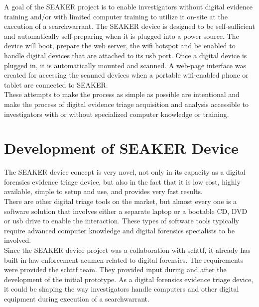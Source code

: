 \documentclass[12pt]{article}
\begin{document}
A goal of the SEAKER project is to enable investigators without 
digital evidence training and/or with limited computer training to utilize it
on-site at the execution of a \gls{searchwarrant}.  The SEAKER device is designed to
be self-sufficient and automatically self-preparing when it is plugged into a 
power source.  The device will boot, prepare the web server, the \gls{wifi} hotspot
and be enabled to handle digital devices that are attached to its \gls{usb} port.
Once a digital device is plugged in, it is automatically mounted and scanned.
A web-page interface was created for accessing the scanned devices when a portable
\gls{wifi}-enabled phone or tablet are connected to SEAKER.\\

These attempts to make the process as simple as possible are intentional and 
make the process of digital evidence triage acquisition and analysis
accessible to investigators with or without specialized computer knowledge or
training.\\

\section{Development of SEAKER Device}
\label{sect-developmentSeakerDevice}

The SEAKER device concept is very novel, not only in its capacity as a digital 
forensics evidence triage device, but also in the fact that it is low cost, highly
available, simple to setup and use, and provides very fast results.\\

There are other digital triage tools on the market, but almost every one is a
software solution that involves either a separate laptop or a bootable
CD, DVD or \gls{usb} drive to enable the interaction.  These types of software tools
typically require advanced computer knowledge and digital forensics specialists
to be involved.\\

Since the SEAKER device project was a collaboration with \gls{schttf}, it already has
built-in law enforcement acumen related to digital forensics.  The requirements were
provided the \gls{schttf} team.  They provided input during and after the development
of the initial prototype.  As a digital
forensics evidence triage device, it could be shaping the way investigators
handle computers and other digital equipment during execution of a \gls{searchwarrant}.\\
\end{document}
